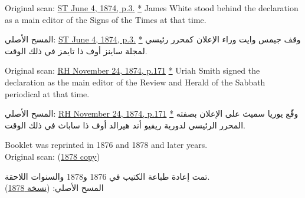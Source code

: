 Original scan: \href{https://adventistdigitallibrary.org/adl-364148/signs-times-june-4-1874}{ST June 4, 1874, p.3.} \href{https://forgotten-pillar.s3.us-east-2.amazonaws.com/Signs+of+the+Times+_+June+4%2C+1874++.pdf}{*} James White stood behind the declaration as a main editor of the Signs of the Times at that time.


المسح الأصلي: \href{https://adventistdigitallibrary.org/adl-364148/signs-times-june-4-1874}{ST June 4, 1874, p.3.} \href{https://forgotten-pillar.s3.us-east-2.amazonaws.com/Signs+of+the+Times+_+June+4%2C+1874++.pdf}{*} وقف جيمس وايت وراء الإعلان كمحرر رئيسي لمجلة ساينز أوف ذا تايمز في ذلك الوقت.






Original scan: \href{https://documents.adventistarchives.org/Periodicals/RH/RH18741124-V44-22.pdf}{RH November 24, 1874, p.171} \href{https://forgotten-pillar.s3.us-east-2.amazonaws.com/RH18741124-V44-22.pdf}{*} Uriah Smith signed the declaration as the main editor of the Review and Herald of the Sabbath periodical at that time.


المسح الأصلي: \href{https://documents.adventistarchives.org/Periodicals/RH/RH18741124-V44-22.pdf}{RH November 24, 1874, p.171} \href{https://forgotten-pillar.s3.us-east-2.amazonaws.com/RH18741124-V44-22.pdf}{*} وقّع يوريا سميث على الإعلان بصفته المحرر الرئيسي لدورية ريفيو أند هيرالد أوف ذا ساباث في ذلك الوقت.






Booklet was reprinted in 1876 and 1878 and later years. \\
Original scan: (\href{https://adventistdigitallibrary.org/islandora/object/adl%3A22250872?solr_nav%5Bid%5D=a09d3902c2540c98eb7f&solr_nav%5Bpage%5D=56&solr_nav%5Boffset%5D=3}{1878 copy})


تمت إعادة طباعة الكتيب في 1876 و1878 والسنوات اللاحقة. \\
المسح الأصلي: (\href{https://adventistdigitallibrary.org/islandora/object/adl%3A22250872?solr_nav%5Bid%5D=a09d3902c2540c98eb7f&solr_nav%5Bpage%5D=56&solr_nav%5Boffset%5D=3}{نسخة 1878})




